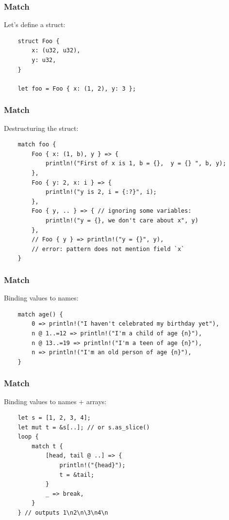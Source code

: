 \documentclass[aspectratio=1610,t]{beamer}
\begin{document}

\begin{frame}[fragile]
\frametitle{Match}
Let's define a struct:

\begin{verbatim}
    struct Foo {
        x: (u32, u32),
        y: u32,
    }

    let foo = Foo { x: (1, 2), y: 3 };
\end{verbatim}
\end{frame}


\begin{frame}[fragile]
\frametitle{Match}
Destructuring the struct:

\begin{verbatim}
    match foo {
        Foo { x: (1, b), y } => {
            println!("First of x is 1, b = {},  y = {} ", b, y);
        },
        Foo { y: 2, x: i } => {
            println!("y is 2, i = {:?}", i);
        },
        Foo { y, .. } => { // ignoring some variables:
            println!("y = {}, we don't care about x", y)
        },
        // Foo { y } => println!("y = {}", y),
        // error: pattern does not mention field `x`
    }
\end{verbatim}
\end{frame}


\begin{frame}[fragile]
\frametitle{Match}
Binding values to names:

\begin{verbatim}
    match age() {
        0 => println!("I haven't celebrated my birthday yet"),
        n @ 1..=12 => println!("I'm a child of age {n}"),
        n @ 13..=19 => println!("I'm a teen of age {n}"),
        n => println!("I'm an old person of age {n}"),
    }
\end{verbatim}
\end{frame}


\begin{frame}[fragile]
\frametitle{Match}
Binding values to names + arrays:

\begin{verbatim}
    let s = [1, 2, 3, 4];
    let mut t = &s[..]; // or s.as_slice()
    loop {
        match t {
            [head, tail @ ..] => {
                println!("{head}");
                t = &tail;
            }
            _ => break,
        }  
    } // outputs 1\n2\n\3\n4\n
\end{verbatim}
\end{frame}
\end{document}
